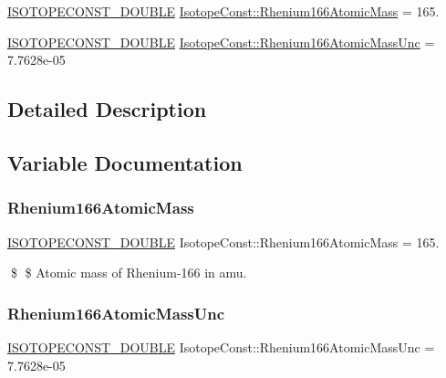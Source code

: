 \begin{DoxyCompactItemize}
\item 
\mbox{\hyperlink{group___isotope_const-_macros_ga8f45a7272ce02c0b4c65c44636ed719a}{I\+S\+O\+T\+O\+P\+E\+C\+O\+N\+S\+T\+\_\+\+D\+O\+U\+B\+LE}} \mbox{\hyperlink{group___isotope_const-_rhenium-_re166_gad12f30db27f1677db6fd889460334eab}{Isotope\+Const\+::\+Rhenium166\+Atomic\+Mass}} = 165.
\item 
\mbox{\hyperlink{group___isotope_const-_macros_ga8f45a7272ce02c0b4c65c44636ed719a}{I\+S\+O\+T\+O\+P\+E\+C\+O\+N\+S\+T\+\_\+\+D\+O\+U\+B\+LE}} \mbox{\hyperlink{group___isotope_const-_rhenium-_re166_gab50522de930a0d6fc6a3af2364002bb0}{Isotope\+Const\+::\+Rhenium166\+Atomic\+Mass\+Unc}} = 7.\+7628e-\/05
\end{DoxyCompactItemize}


\subsection{Detailed Description}


\subsection{Variable Documentation}
\mbox{\label{group___isotope_const-_rhenium-_re166_gad12f30db27f1677db6fd889460334eab}} 
\subsubsection{\texorpdfstring{Rhenium166\+Atomic\+Mass}{Rhenium166AtomicMass}}
{\footnotesize\ttfamily \mbox{\hyperlink{group___isotope_const-_macros_ga8f45a7272ce02c0b4c65c44636ed719a}{I\+S\+O\+T\+O\+P\+E\+C\+O\+N\+S\+T\+\_\+\+D\+O\+U\+B\+LE}} Isotope\+Const\+::\+Rhenium166\+Atomic\+Mass = 165.}

\$ \$ Atomic mass of Rhenium-\/166 in amu. \mbox{\label{group___isotope_const-_rhenium-_re166_gab50522de930a0d6fc6a3af2364002bb0}} 
\subsubsection{\texorpdfstring{Rhenium166\+Atomic\+Mass\+Unc}{Rhenium166AtomicMassUnc}}
{\footnotesize\ttfamily \mbox{\hyperlink{group___isotope_const-_macros_ga8f45a7272ce02c0b4c65c44636ed719a}{I\+S\+O\+T\+O\+P\+E\+C\+O\+N\+S\+T\+\_\+\+D\+O\+U\+B\+LE}} Isotope\+Const\+::\+Rhenium166\+Atomic\+Mass\+Unc = 7.\+7628e-\/05}

